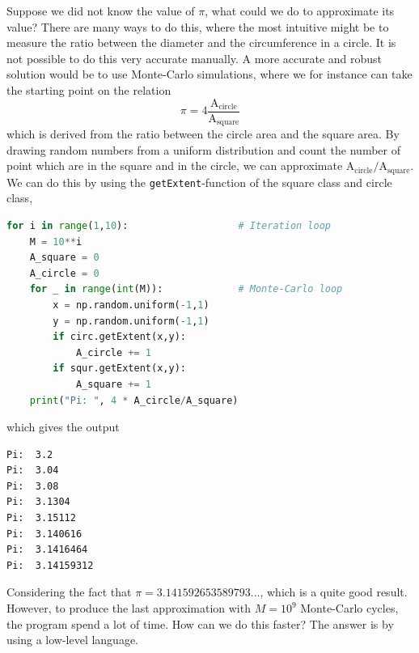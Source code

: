 Suppose we did not know the value of $\pi$, what could we do to approximate its value? There are many ways to do this, where the most intuitive might be to measure the ratio between the diameter and the circumference in a circle. It is not possible to do this very accurate manually. A more accurate and robust solution would be to use Monte-Carlo simulations, where we for instance can take the starting point on the relation
\begin{equation}
\pi=4\frac{\text{A}_{\text{circle}}}{\text{A}_{\text{square}}}
\end{equation}
which is derived from the ratio between the circle area and the square area. By drawing random numbers from a uniform distribution and count the number of point which are in the square and in the circle, we can approximate $\text{A}_{\text{circle}}/\text{A}_{\text{square}}$. We can do this by using the \texttt{getExtent}-function of the square class and circle class,
\lstset{basicstyle=\scriptsize}
\begin{lstlisting}[language=python]
for i in range(1,10):					# Iteration loop
	M = 10**i
	A_square = 0
	A_circle = 0
	for _ in range(int(M)):				# Monte-Carlo loop
		x = np.random.uniform(-1,1)
		y = np.random.uniform(-1,1)
		if circ.getExtent(x,y):
			A_circle += 1
		if squr.getExtent(x,y):
			A_square += 1
	print("Pi: ", 4 * A_circle/A_square)
\end{lstlisting}
which gives the output
\begin{lstlisting}
Pi:  3.2
Pi:  3.04
Pi:  3.08
Pi:  3.1304
Pi:  3.15112
Pi:  3.140616
Pi:  3.1416464
Pi:  3.14159312
\end{lstlisting}
Considering the fact that $\pi=3.141592653589793...$, which is a quite good result. However, to produce the last approximation with $M=10^9$ Monte-Carlo cycles, the program spend a lot of time. How can we do this faster? The answer is by using a low-level language. 

